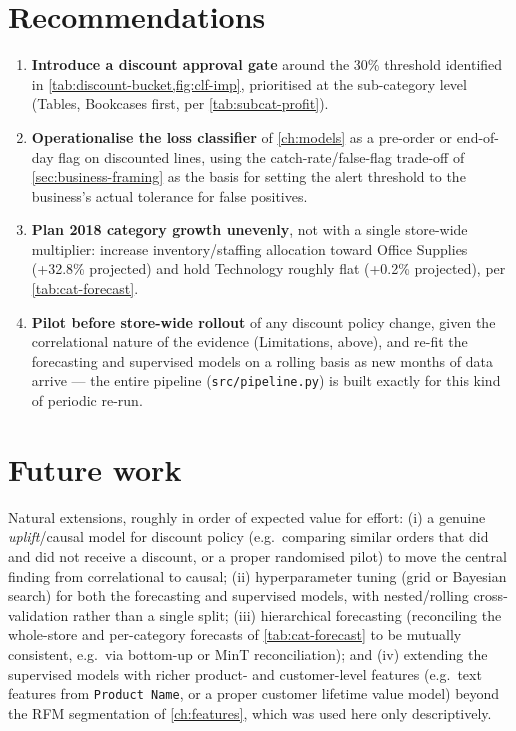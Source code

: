 \section{Recommendations}
\begin{enumerate}[label=\arabic*.]
  \item \textbf{Introduce a discount approval gate} around the 30\%
        threshold identified in \cref{tab:discount-bucket,fig:clf-imp},
        prioritised at the sub-category level (Tables, Bookcases first,
        per \cref{tab:subcat-profit}).
  \item \textbf{Operationalise the loss classifier} of \cref{ch:models}
        as a pre-order or end-of-day flag on discounted lines, using the
        catch-rate/false-flag trade-off of \cref{sec:business-framing}
        as the basis for setting the alert threshold to the
        business's actual tolerance for false positives.
  \item \textbf{Plan 2018 category growth unevenly}, not with a single
        store-wide multiplier: increase inventory/staffing allocation
        toward Office Supplies (+32.8\% projected) and hold Technology
        roughly flat (+0.2\% projected), per \cref{tab:cat-forecast}.
  \item \textbf{Pilot before store-wide rollout} of any discount policy
        change, given the correlational nature of the evidence
        (Limitations, above), and re-fit the forecasting and supervised
        models on a rolling basis as new months of data arrive — the
        entire pipeline (\texttt{src/pipeline.py}) is built exactly for
        this kind of periodic re-run.
\end{enumerate}

\section{Future work}
Natural extensions, roughly in order of expected value for effort:
(i) a genuine \emph{uplift}/causal model for discount policy (e.g.\
comparing similar orders that did and did not receive a discount, or a
proper randomised pilot) to move the central finding from correlational
to causal; (ii) hyperparameter tuning (grid or Bayesian search) for both
the forecasting and supervised models, with nested/rolling
cross-validation rather than a single split; (iii) hierarchical
forecasting (reconciling the whole-store and per-category forecasts of
\cref{tab:cat-forecast} to be mutually consistent, e.g.\ via bottom-up or
MinT reconciliation); and (iv) extending the supervised models with
richer product- and customer-level features (e.g.\ text features from
\texttt{Product Name}, or a proper customer lifetime value model) beyond
the RFM segmentation of \cref{ch:features}, which was used here only
descriptively.

